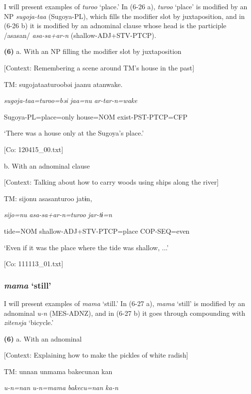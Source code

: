 I will present examples of \textit{turoo} ‘place.’ In (6-26 a), \textit{turoo} ‘place’ is modified by an NP \textit{sugoja-taa} (Sugoya-PL), which fills the modifier slot by juxtaposition, and in (6-26 b) it is modified by an adnominal clause whose head is the participle /asasan/ \textit{asa-sa+ar-n} (shallow-ADJ+STV-PTCP).

\textbf{(6)}  a.  With an NP filling the modifier slot by juxtaposition

    [Context: Remembering a scene around TM’s house in the past]

    TM:  sugojataaturoobəi  jaanu  atanwake.

      \textit{sugoja-taa=turoo=bəi}  \textit{jaa=nu}  \textit{ar-tar-n=wake}

      Sugoya-PL=place=only  house=NOM  exist-PST-PTCP=CFP

      ‘There was a house only at the Sugoya’s place.’

      [Co: 120415\_00.txt]

  b.  With an adnominal clause

    [Context: Talking about how to carry woods using ships along the river]

    TM:  {\textbar}sijo{\textbar}nu  asasanturoo  jatɨn,

      \textit{sijo=nu}  \textit{asa-sa+ar-n=turoo}  \textit{jar-tɨ=n}

      tide=NOM  shallow-ADJ+STV-PTCP=place  COP-SEQ=even

      ‘Even if it was the place where the tide was shallow, ...’

      [Co: 111113\_01.txt]

\subsubsection{ \textit{mama} ‘still’}

I will present examples of \textit{mama} ‘still.’ In (6-27 a), \textit{mama} ‘still’ is modified by an adnominal \textit{u-n} (MES-ADNZ), and in (6-27 b) it goes through compounding with \textit{zitensja} ‘bicycle.’

\textbf{(6)}  a.  With an adnominal

    [Context: Explaining how to make the pickles of white radish]

    TM:  unnan  unmama  {\textbar}bakecu{\textbar}nan  kan

      \textit{u-n=nan}  \textit{u-n=mama}  \textit{bakecu=nan}  \textit{ka-n}

